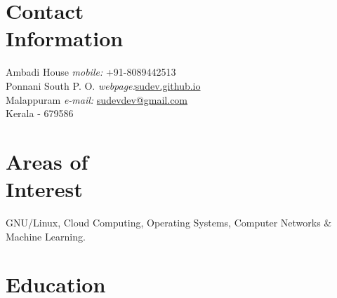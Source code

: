 \documentclass[margin,line]{resume}
\begin{document}
\begin{resume}

    \section{\mysidestyle Contact\\Information}
    
        
    Ambadi House   \hfill \textit{mobile:} \hspace{9mm} 		+91-8089442513 \\ 
    Ponnani South P. O.	\hfill \textit{webpage:}\hspace{14mm}\href{http://sudev.github.io}{sudev.github.io}\\
    Malappuram \hfill 	\textit{e-mail:} \hspace{3.6mm}\href{mailto:sudevdev@gmail.com}{sudevdev@gmail.com}     \\
    Kerala - 679586
			
        \vspace{-2.5mm}
        
        \vspace{3mm}
%
					
    \section{\mysidestyle Areas of\\Interest}

   GNU/Linux, Cloud Computing, Operating Systems, Computer Networks \&  Machine Learning.
\vspace{3mm}


    \section{\mysidestyle Education}


\end{resume}
\end{document}
